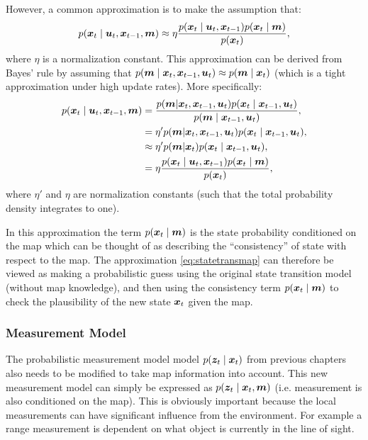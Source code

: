However, a common approximation is to make the assumption that:
\begin{equation} \label{eq:statetransmap}
p(\bm{x}_t \mid \bm{u}_t, \bm{x}_{t-1}, \bm{m}) \approx \eta \frac{p(\bm{x}_{t}\mid \bm{u}_{t}, \bm{x}_{t-1} ) p(\bm{x}_{t} \mid \bm{m} )}{p(\bm{x}_{t})},
\end{equation}
where $\eta$ is a normalization constant. This approximation can be derived from Bayes' rule by assuming that $p(\bm{m} \mid \bm{x}_t, \bm{x}_{t-1}, \bm{u}_t) \approx p(\bm{m} \mid \bm{x}_t)$ (which is a tight approximation under high update rates). More specifically:
\begin{equation*}
\begin{split}
p(\bm{x}_t \mid \bm{u}_t, \bm{x}_{t-1}, \bm{m}) &= \frac{p(\bm{m} | \bm{x}_{t}, \bm{x}_{t-1}, \bm{u}_{t}) p(\bm{x}_{t} \mid \bm{x}_{t-1}, \bm{u}_t)}{p(\bm{m} \mid \bm{x}_{t-1}, \bm{u}_{t})}, \\
&= \eta' p(\bm{m} | \bm{x}_{t}, \bm{x}_{t-1}, \bm{u}_{t}) p(\bm{x}_{t} \mid \bm{x}_{t-1}, \bm{u}_t), \\
&\approx \eta' p(\bm{m} | \bm{x}_{t}) p(\bm{x}_{t} \mid \bm{x}_{t-1}, \bm{u}_t), \\
& =\eta \frac{p(\bm{x}_{t}\mid \bm{u}_{t}, \bm{x}_{t-1} ) p(\bm{x}_{t} \mid \bm{m} )}{p(\bm{x}_{t})},
\end{split}
\end{equation*}
where $\eta'$ and $\eta$ are normalization constants (such that the total probability density integrates to one).

In this approximation the term $p(\bm{x}_{t} \mid \bm{m} )$ is the state probability conditioned on the map which can be thought of as describing the ``consistency'' of state with respect to the map. The approximation \eqref{eq:statetransmap} can therefore be viewed as making a probabilistic guess using the original state transition model (without map knowledge), and then using the consistency term $p(\bm{x}_{t} \mid \bm{m} )$ to check the plausibility of the new state $\bm{x}_t$ given the map.


\subsubsection{Measurement Model}
The probabilistic measurement model model $p(\bm{z}_t \mid \bm{x}_t)$ from previous chapters also needs to be modified to take map information into account. This new measurement model can simply be expressed as $p(\bm{z}_t \mid \bm{x}_t, \bm{m})$ (i.e. measurement is also conditioned on the map). This is obviously important because the local measurements can have significant influence from the environment. For example a range measurement is dependent on what object is currently in the line of sight.

